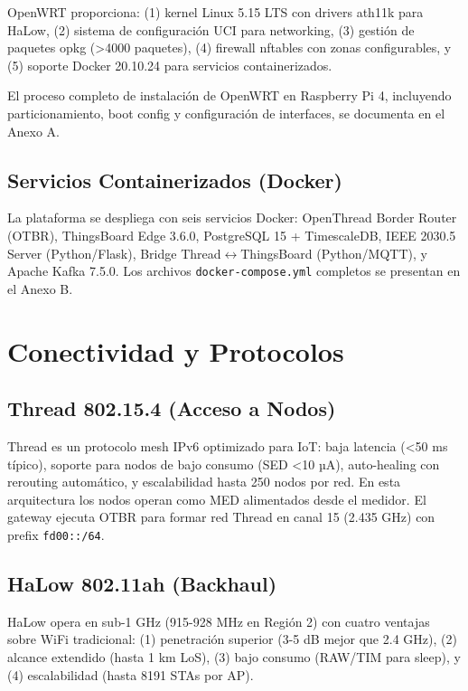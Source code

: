 OpenWRT proporciona: (1) kernel Linux 5.15 LTS con drivers ath11k para HaLow, (2) sistema de configuración UCI para networking, (3) gestión de paquetes opkg (>4000 paquetes), (4) firewall nftables con zonas configurables, y (5) soporte Docker 20.10.24 para servicios containerizados.

El proceso completo de instalación de OpenWRT en Raspberry Pi 4, incluyendo particionamiento, boot config y configuración de interfaces, se documenta en el Anexo A.

\subsection{Servicios Containerizados (Docker)}

La plataforma se despliega con seis servicios Docker: OpenThread Border Router (OTBR), ThingsBoard Edge 3.6.0, PostgreSQL 15 + TimescaleDB, IEEE 2030.5 Server (Python/Flask), Bridge Thread$\leftrightarrow$ThingsBoard (Python/MQTT), y Apache Kafka 7.5.0. Los archivos \texttt{docker-compose.yml} completos se presentan en el Anexo B.

\section{Conectividad y Protocolos}

\subsection{Thread 802.15.4 (Acceso a Nodos)}

Thread es un protocolo mesh IPv6 optimizado para IoT: baja latencia (<50 ms típico), soporte para nodos de bajo consumo (SED <10 µA), auto-healing con rerouting automático, y escalabilidad hasta 250 nodos por red. En esta arquitectura los nodos operan como MED alimentados desde el medidor. El gateway ejecuta OTBR para formar red Thread en canal 15 (2.435 GHz) con prefix \texttt{fd00::/64}.

\subsection{HaLow 802.11ah (Backhaul)}

HaLow opera en sub-1 GHz (915-928 MHz en Región 2) con cuatro ventajas sobre WiFi tradicional: (1) penetración superior (3-5 dB mejor que 2.4 GHz), (2) alcance extendido (hasta 1 km LoS), (3) bajo consumo (RAW/TIM para sleep), y (4) escalabilidad (hasta 8191 STAs por AP).

